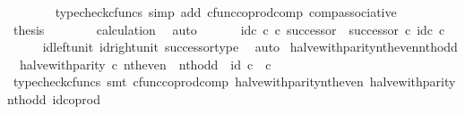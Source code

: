 \begin{isabellebody}
\ \ \ \ \ \ \isamarkupfalse%
\ {\isacharparenleft}{\kern0pt}typecheck{\isacharunderscore}{\kern0pt}cfuncs{\isacharcomma}{\kern0pt}\ simp\ add{\isacharcolon}{\kern0pt}\ cfunc{\isacharunderscore}{\kern0pt}coprod{\isacharunderscore}{\kern0pt}comp\ comp{\isacharunderscore}{\kern0pt}associative{}{\isacharparenright}{\kern0pt}\isanewline
\ \ \ \ \isamarkupfalse%
\ \isamarkupfalse%
\ {\isacharquery}{\kern0pt}thesis\isanewline
\ \ \ \ \ \ \isamarkupfalse%
\ calculation\ \isamarkupfalse%
\ auto\isanewline
\ \ \isamarkupfalse%
\isanewline
\isanewline
\ \ \isamarkupfalse%
\ {\isachardoublequoteopen}id\isactrlsub c\ {\isasymnat}\isactrlsub c\ {\isasymcirc}\isactrlsub c\ successor\ {\isacharequal}{\kern0pt}\ successor\ {\isasymcirc}\isactrlsub c\ id\isactrlsub c\ {\isasymnat}\isactrlsub c{\isachardoublequoteclose}\isanewline
\ \ \ \ \isamarkupfalse%
\ id{\isacharunderscore}{\kern0pt}left{\isacharunderscore}{\kern0pt}unit{}\ id{\isacharunderscore}{\kern0pt}right{\isacharunderscore}{\kern0pt}unit{}\ successor{\isacharunderscore}{\kern0pt}type\ \isamarkupfalse%
\ auto\isanewline
{}\isamarkupfalse%
%
\endisatagproof
{\isafoldproof}%
%
\isadelimproof
\isanewline
%
\endisadelimproof
\isanewline
{}\isamarkupfalse%
\ halve{\isacharunderscore}{\kern0pt}with{\isacharunderscore}{\kern0pt}parity{\isacharunderscore}{\kern0pt}nth{\isacharunderscore}{\kern0pt}even{\isacharunderscore}{\kern0pt}nth{\isacharunderscore}{\kern0pt}odd{\isacharcolon}{\kern0pt}\isanewline
\ \ {\isachardoublequoteopen}halve{\isacharunderscore}{\kern0pt}with{\isacharunderscore}{\kern0pt}parity\ {\isasymcirc}\isactrlsub c\ {\isacharparenleft}{\kern0pt}nth{\isacharunderscore}{\kern0pt}even\ {\isasymamalg}\ nth{\isacharunderscore}{\kern0pt}odd{\isacharparenright}{\kern0pt}\ {\isacharequal}{\kern0pt}\ id\ {\isacharparenleft}{\kern0pt}{\isasymnat}\isactrlsub c\ {\isasymCoprod}\ {\isasymnat}\isactrlsub c{\isacharparenright}{\kern0pt}{\isachardoublequoteclose}\isanewline
%
\isadelimproof
\ \ %
\endisadelimproof
%
\isatagproof
{}\isamarkupfalse%
\ {\isacharparenleft}{\kern0pt}typecheck{\isacharunderscore}{\kern0pt}cfuncs{\isacharcomma}{\kern0pt}\ smt\ cfunc{\isacharunderscore}{\kern0pt}coprod{\isacharunderscore}{\kern0pt}comp\ halve{\isacharunderscore}{\kern0pt}with{\isacharunderscore}{\kern0pt}parity{\isacharunderscore}{\kern0pt}nth{\isacharunderscore}{\kern0pt}even\ halve{\isacharunderscore}{\kern0pt}with{\isacharunderscore}{\kern0pt}parity{\isacharunderscore}{\kern0pt}nth{\isacharunderscore}{\kern0pt}odd\ id{\isacharunderscore}{\kern0pt}coprod{\isacharparenright}{\kern0pt}%

\end{isabellebody}
